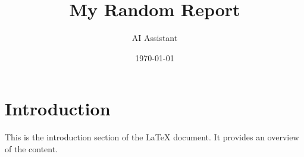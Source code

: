 \documentclass{article}
\title{My Random Report}
\author{AI Assistant}
\date{\today}
\begin{document}
\maketitle

\section{Introduction}
This is the introduction section of the LaTeX document. It provides an overview of the content.
\end{document}
